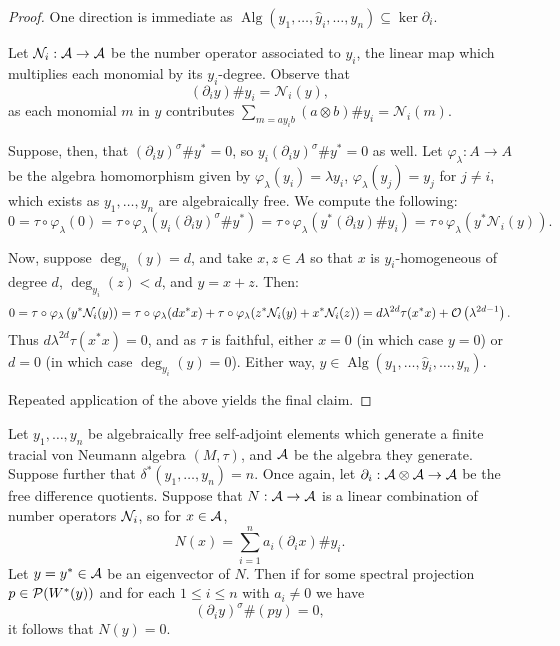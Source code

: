 \begin{proof}
	One direction is immediate as $\operatorname{Alg}(y_1, \ldots, \hat y_i, \ldots, y_n) \subseteq \ker\partial_i$.

	Let $\mathcal{N}_i : \mathcal{A} \to \mathcal{A}$ be the number operator associated to $y_i$, the linear map which multiplies each monomial by its $y_i$-degree.
	Observe that
	$$(\partial_i y)\# y_i = \mathcal{N}_i(y),$$
	as each monomial $m$ in $y$ contributes $\sum_{m = ay_ib} (a\otimes b)\# y_i = \mathcal{N}_i(m)$.

	Suppose, then, that $(\partial_i y)^\sigma\#y^* = 0$, so $y_i(\partial_i y)^\sigma\#y^* = 0$ as well.
	Let $\varphi_\lambda : A \to A$ be the algebra homomorphism given by $\varphi_\lambda(y_i) = \lambda y_i$, $\varphi_\lambda(y_j) = y_j$ for $j \neq i$, which exists as $y_1, \ldots, y_n$ are algebraically free.
	We compute the following:
	$$
	0
	= \tau\circ\varphi_\lambda(0)
	= \tau\circ\varphi_\lambda\left(y_i(\partial_i y)^\sigma\#y^*\right)
	= \tau\circ\varphi_\lambda\left(y^*(\partial_i y)\# y_i\right)
	= \tau\circ\varphi_\lambda\left(y^* \mathcal{N}_i(y)\right).
	$$

	Now, suppose $\deg_{y_i}(y) = d$, and take $x, z \in A$ so that $x$ is $y_i$-homogeneous of degree $d$, $\deg_{y_i}(z) < d$, and $y = x + z$.
	Then:
	$$
	0
	= \tau\circ\varphi_\lambda\left( y^*\mathcal{N}_i(y) \right)
	= \tau\circ\varphi_\lambda(dx^*x) + \tau\circ\varphi_\lambda(z^*\mathcal{N}_i(y) + x^*\mathcal{N}_i(z))
	= d\lambda^{2d}\tau(x^*x) + \mathcal{O}\left(\lambda^{2d-1}\right).
	$$
	Thus $d\lambda^{2d}\tau(x^*x) = 0$, and as $\tau$ is faithful, either $x = 0$ (in which case $y = 0$) or $d = 0$ (in which case $\deg_{y_i}(y) = 0$).
	Either way, $y \in \operatorname{Alg}(y_1, \ldots, \hat y_i, \ldots, y_n)$.

	Repeated application of the above yields the final claim.
\end{proof}

\begin{lemma}
	\label{lem:zero-der-again}
	Let $y_1, \ldots, y_n$ be algebraically free self-adjoint elements which generate a finite tracial von Neumann algebra $(M, \tau)$, and $\mathcal{A}$ be the algebra they generate.
	Suppose further that $\delta^*(y_1, \ldots, y_n) = n$.
	Once again, let $\partial_i : \mathcal{A}\otimes\mathcal{A} \to \mathcal{A}$ be the free difference quotients.
	Suppose that $N: \mathcal{A} \to \mathcal{A}$ is a linear combination of number operators $\mathcal{N}_i$, so for $x \in \mathcal{A}$,
	$$N(x) = \sum_{i=1}^n a_i(\partial_ix)\# y_i.$$
	Let $y = y^* \in \mathcal{A}$ be an eigenvector of $N$.
	Then if for some spectral projection $p \in \mathcal{P}(W^*(y))$ and for each $1 \leq i \leq n$ with $a_i \neq 0$ we have
	$$(\partial_i y)^\sigma\#(py) = 0,$$
	it follows that $N(y) = 0$.
\end{lemma}

